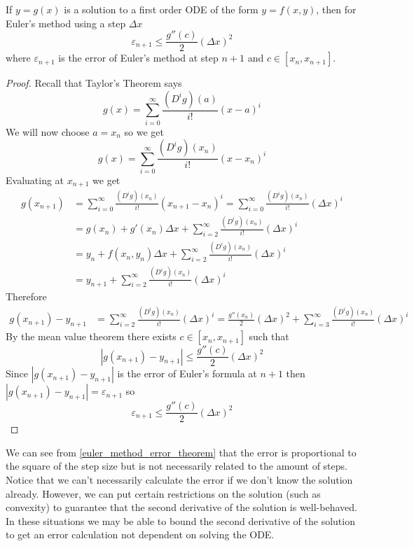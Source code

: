\documentclass[notes]{subfiles}
\begin{document}
\begin{theorem} \label{euler_method_error_theorem}
    If $y = g(x)$ is a solution to a first order ODE of the form $y = f(x, y)$, then for Euler's method using a step $\Delta x$
    \[
        \varepsilon_{n + 1} \leq \frac{g''(c)}{2}(\Delta x)^2
    \]
    where $\varepsilon_{n + 1}$ is the error of Euler's method at step $n + 1$ and $c \in [x_n, x_{n + 1}]$.
\end{theorem}
\begin{proof}
Recall that Taylor's Theorem says
\[
    g(x) = \sum_{i = 0}^\infty \frac{(D^i g)(a)}{i!}(x - a)^i
\]
We will now choose $a = x_n$ so we get
\[
    g(x) = \sum_{i = 0}^\infty \frac{(D^i g)(x_n)}{i!}(x - x_n)^i
\]
Evaluating at $x_{n + 1}$ we get
\begin{align*}
    g(x_{n + 1})
    &= \sum_{i = 0}^\infty \frac{(D^i g)(x_n)}{i!}(x_{n + 1} - x_n)^i
    = \sum_{i = 0}^\infty \frac{(D^i g)(x_n)}{i!}(\Delta x)^i \\
    &= g(x_n) + g'(x_n)\Delta x + \sum_{i = 2}^\infty \frac{(D^i g)(x_n)}{i!}(\Delta x)^i \\
    &= y_n + f(x_n, y_n)\Delta x + \sum_{i = 2}^\infty \frac{(D^i g)(x_n)}{i!}(\Delta x)^i \\
    &= y_{n + 1} + \sum_{i = 2}^\infty \frac{(D^i g)(x_n)}{i!}(\Delta x)^i
\end{align*}
Therefore
\begin{align*}
    g(x_{n + 1}) - y_{n + 1}
    &= \sum_{i = 2}^\infty \frac{(D^i g)(x_n)}{i!}(\Delta x)^i
    = \frac{g''(x_n)}{2}(\Delta x)^2 + \sum_{i = 3}^\infty \frac{(D^i g)(x_n)}{i!}(\Delta x)^i
\end{align*}
By the mean value theorem there exists $c \in [x_n, x_{n + 1}]$ such that
\[
    |g(x_{n + 1}) - y_{n + 1}| \leq \frac{g''(c)}{2}(\Delta x)^2
\]
Since $|g(x_{n + 1}) - y_{n + 1}|$ is the error of Euler's formula at $n + 1$ then $|g(x_{n + 1}) - y_{n + 1}| = \varepsilon_{n + 1}$ so
\[
    \varepsilon_{n + 1} \leq \frac{g''(c)}{2}(\Delta x)^2
\]
\end{proof}

We can see from \cref{euler_method_error_theorem} that the error is proportional to the square of the step size but is not necessarily related to the amount of steps. Notice that we can't necessarily calculate the error if we don't know the solution already. However, we can put certain restrictions on the solution (such as convexity) to guarantee that the second derivative of the solution is well-behaved. In these situations we may be able to bound the second derivative of the solution to get an error calculation not dependent on solving the ODE.
\end{document}
